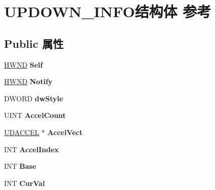 \hypertarget{struct_u_p_d_o_w_n___i_n_f_o}{}\section{U\+P\+D\+O\+W\+N\+\_\+\+I\+N\+F\+O结构体 参考}
\label{struct_u_p_d_o_w_n___i_n_f_o}
\subsection*{Public 属性}
\begin{DoxyCompactItemize}
\item 
\mbox{\label{struct_u_p_d_o_w_n___i_n_f_o_a2019b99773bab3e958687ce1af58e7a0}} 
\hyperlink{interfacevoid}{H\+W\+ND} {\bfseries Self}
\item 
\mbox{\label{struct_u_p_d_o_w_n___i_n_f_o_a73a4dddda248cb41d4f501c43bdcc62b}} 
\hyperlink{interfacevoid}{H\+W\+ND} {\bfseries Notify}
\item 
\mbox{\label{struct_u_p_d_o_w_n___i_n_f_o_a55d799106530f85d11e869d8ddd3de40}} 
D\+W\+O\+RD {\bfseries dw\+Style}
\item 
\mbox{\label{struct_u_p_d_o_w_n___i_n_f_o_a363234b971085527e5010e802322ccee}} 
U\+I\+NT {\bfseries Accel\+Count}
\item 
\mbox{\label{struct_u_p_d_o_w_n___i_n_f_o_a7d9bbc663eebc058bfb8370c0b330857}} 
\hyperlink{struct___u_d_a_c_c_e_l}{U\+D\+A\+C\+C\+EL} $\ast$ {\bfseries Accel\+Vect}
\item 
\mbox{\label{struct_u_p_d_o_w_n___i_n_f_o_a871c8d6435485b955cc02ec84b046c78}} 
I\+NT {\bfseries Accel\+Index}
\item 
\mbox{\label{struct_u_p_d_o_w_n___i_n_f_o_abca89563201fad5e237301336e30d78a}} 
I\+NT {\bfseries Base}
\item 
\mbox{\label{struct_u_p_d_o_w_n___i_n_f_o_ae5e22b71692e6d33e7f55d502237b64f}} 
I\+NT {\bfseries Cur\+Val}
\item 

\end{DoxyCompactItemize}
